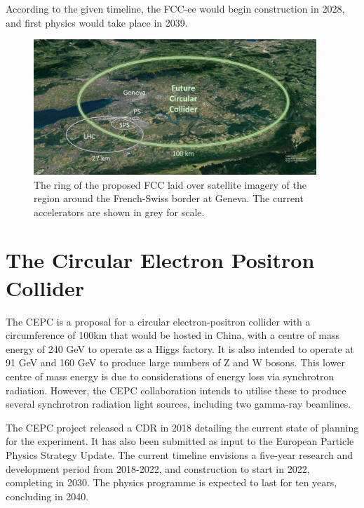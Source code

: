 According to the given timeline, the FCC-ee would begin construction in 2028, and first physics would take place in 2039. 

\begin{figure}[h]
	\centering
	\includegraphics[width=0.95\textwidth]{../Pictures/FCC-Scale.jpg}
	\caption{The ring of the proposed \acrlong{FCC} laid over satellite imagery of the region around the French-Swiss border at Geneva. The current accelerators are shown in grey for scale.}
	\label{figure:colliders/FCC/scale}
\end{figure}


\section{The Circular Electron Positron Collider}
The \acrfull{CEPC} is a proposal for a circular electron-positron collider with a circumference of 100km that would be hosted in China, with a centre of mass energy of 240 GeV to operate as a Higgs factory. It is also intended to operate at 91 GeV and 160 GeV to produce large numbers of Z and W bosons. This lower centre of mass energy is due to considerations of energy loss via synchrotron radiation. However, the \acrshort{CEPC} collaboration intends to utilise these to produce several synchrotron radiation light sources, including two gamma-ray beamlines.

The \acrshort{CEPC} project released a \acrfull{CDR} in 2018 detailing the current state of planning for the experiment. It has also been submitted as input to the European Particle Physics Strategy Update. The current timeline envisions a five-year research and development period from 2018-2022, and construction to start in 2022, completing in 2030. The physics programme is expected to last for ten years, concluding in 2040. 

